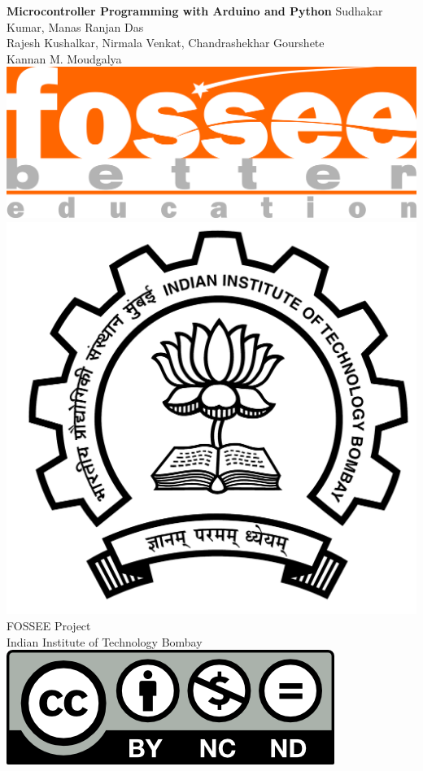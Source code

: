 \begin{center}
    {\bf {\Huge Microcontroller Programming with Arduino and Python}}
    \vfill
    Sudhakar Kumar, Manas Ranjan Das \\
    Rajesh Kushalkar, Nirmala Venkat, Chandrashekhar Gourshete \\
    Kannan M. Moudgalya \\
    \vfill
    \includegraphics[width=0.3\linewidth]{suppl/fossee_logo_hi.png} \quad
    \includegraphics[width=0.2\linewidth]{suppl/IITB-logo-HighRes.png} \\
    FOSSEE Project \\
    Indian Institute of Technology Bombay \\ [2mm]
    \includegraphics[width=0.15\linewidth]{suppl/by-nc-nd.png}
\end{center}

\clearpage
